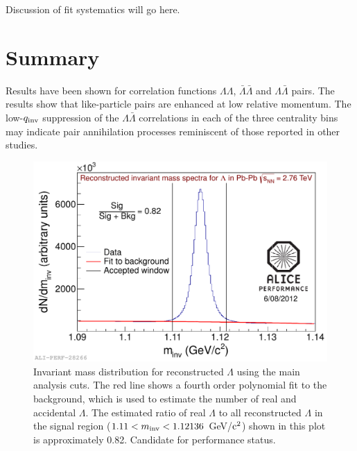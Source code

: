Discussion of fit systematics will go here.

\section{Summary}
Results have been shown for correlation functions $\Lambda\Lambda$, $\bar{\Lambda}\bar{\Lambda}$ and $\Lambda\bar{\Lambda}$ pairs.  The results show that like-particle pairs are enhanced at low relative momentum.  The low-$q_{\rm inv}$ suppression of the $\Lambda\bar{\Lambda}$ correlations in each of the three centrality bins may indicate pair annihilation processes reminiscent of those reported in other studies.

\begin{figure}[hbtp]
\includegraphics[scale=0.6]{2012-Aug-07-LamInvMass_Perf.pdf}
\caption[Invariant mass distribution for reconstructed $\Lambda$]{Invariant mass distribution for reconstructed $\Lambda$ using the main analysis cuts.  The red line shows a fourth order polynomial fit to the background, which is used to estimate the number of real and accidental $\Lambda$.  The estimated ratio of real $\Lambda$ to all reconstructed $\Lambda$ in the signal region ($ 1.11 < m_{\rm inv} < 1.12136$ GeV/${\rm c^2}$) shown in this plot is approximately 0.82.  Candidate for performance status.}
\label{fig:MassLooseCut}
\end{figure}

